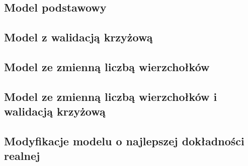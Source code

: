 
\subsection{Model podstawowy}


\subsection{Model z walidacją krzyżową}


\subsection{Model ze zmienną liczbą wierzchołków}


\subsection{Model ze zmienną liczbą wierzchołków i walidacją krzyżową}


\subsection{Modyfikacje modelu o najlepszej dokładności realnej}
